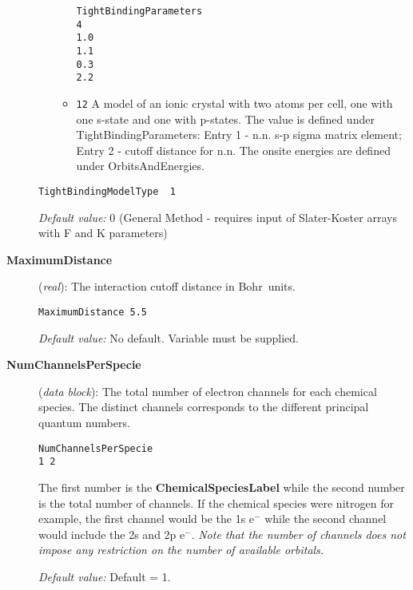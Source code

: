 \begin{description}
\begin{itemize}
\begin{itemize}
\begin{verbatim}
TightBindingParameters
4
1.0
1.1
0.3
2.2
\end{verbatim}

\item {\tt 12} A model of an ionic crystal with two atoms per
cell, one with one s-state and one with p-states. The value is
defined under TightBindingParameters: Entry 1 - n.n. s-p sigma
matrix element; Entry 2 - cutoff distance for n.n.  The onsite
energies are defined under OrbitsAndEnergies.

    \end{itemize}
\end{itemize}

\begin{verbatim}
TightBindingModelType  1
\end{verbatim}

{\it Default value:} 0  (General Method - requires input of
Slater-Koster arrays with F and K parameters)

\item[{\bf MaximumDistance}] ({\it real}):
 The interaction
cutoff distance in Bohr~units.

\begin{verbatim}
MaximumDistance 5.5
\end{verbatim}

{\it Default value:} No default.  Variable must be supplied.

\item[{\bf NumChannelsPerSpecie}] ({\it data block}):
 The total
number of electron channels for each chemical species. The
distinct channels corresponds to the different principal quantum
numbers.

\begin{verbatim}
NumChannelsPerSpecie
1 2
\end{verbatim}

The first number is the {\bf ChemicalSpeciesLabel} while the second
number is the total number of channels. If the chemical species were
nitrogen for example, the first channel would be the 1s e$^-$ while the
second channel would include the 2s and 2p e$^-$. {\it Note that the
number of channels does not impose any restriction on the number of
available orbitals.}

{\it Default value:} Default = 1.



\end{description}

